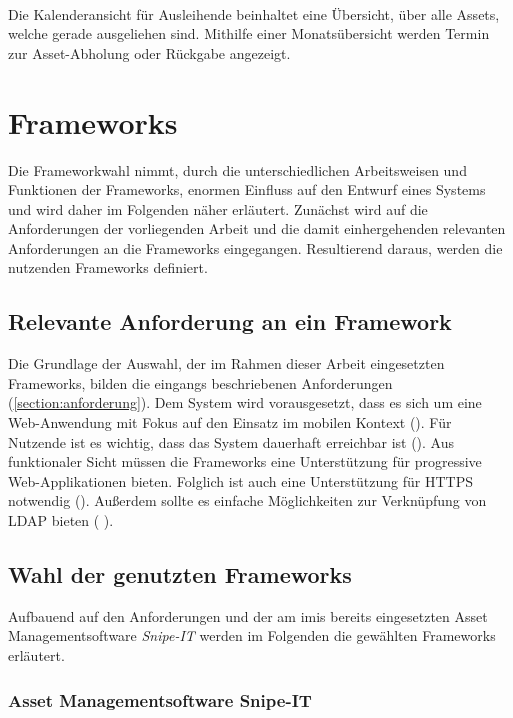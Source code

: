 {\sffamily\color{maincolor}{Ft-B-4 | Kalenderansicht für Ausleihende}}\\
Die Kalenderansicht für Ausleihende beinhaltet eine Übersicht, über alle Assets, welche gerade
ausgeliehen sind. Mithilfe einer Monatsübersicht werden Termin zur Asset-Abholung oder Rückgabe
angezeigt. 

\section{Frameworks}
\label{section:frameworks}
Die Frameworkwahl nimmt, durch die unterschiedlichen Arbeitsweisen und Funktionen der Frameworks,
enormen Einfluss auf den Entwurf eines Systems und wird daher im Folgenden näher erläutert. Zunächst
wird auf die Anforderungen der vorliegenden Arbeit und die damit einhergehenden relevanten
Anforderungen an die Frameworks eingegangen. Resultierend daraus, werden die nutzenden Frameworks
definiert.

\subsection{Relevante Anforderung an ein Framework}
Die Grundlage der Auswahl, der im Rahmen dieser Arbeit eingesetzten Frameworks, bilden die eingangs
beschriebenen Anforderungen (\ref{section:anforderung}). Dem System wird vorausgesetzt, dass es sich
um eine Web-Anwendung mit Fokus auf den Einsatz im mobilen Kontext (). Für
Nutzende ist es wichtig, dass das System dauerhaft erreichbar ist (). Aus funktionaler
Sicht müssen die Frameworks eine Unterstützung für progressive Web-Applikationen bieten. Folglich
ist auch eine Unterstützung für HTTPS notwendig (). Außerdem sollte es einfache
Möglichkeiten zur Verknüpfung von LDAP bieten ( ).

\subsection{Wahl der genutzten Frameworks}
Aufbauend auf den Anforderungen und der am \ac{imis} bereits eingesetzten Asset Managementsoftware
\textit{Snipe-IT} werden im Folgenden die gewählten Frameworks erläutert.

\subsubsection{Asset Managementsoftware Snipe-IT}

